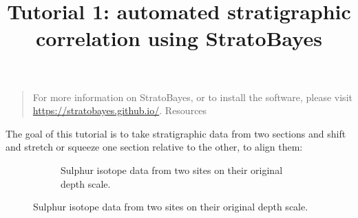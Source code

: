 \documentclass[
  letterpaper,
  DIV=11,
  numbers=noendperiod]{scrartcl}
\title{Tutorial 1: automated stratigraphic correlation using
StratoBayes}
\author{}
\date{}
\begin{document}
\maketitle


\begin{quote}
For more information on StratoBayes, or to install the software, please
visit \url{https://stratobayes.github.io/}. Resources
\end{quote}

The goal of this tutorial is to take stratigraphic data from two
sections and shift and stretch or squeeze one section relative to the
other, to align them:

\begin{figure}

\begin{minipage}{0.48\linewidth}

\begin{figure}[H]


\caption{\label{fig-3-1}Sulphur isotope data from two sites on their
original depth scale.}

\end{figure}%


\end{minipage}
\end{figure}
\end{document}
